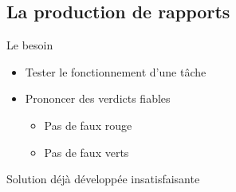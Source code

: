 \documentclass{beamer}
\begin{document}
	\subsection{La production de rapports}
	\begin{frame}{Le besoin}
		\begin{itemize}
			\item Tester le fonctionnement d'une tâche
	\pause
	\vfill
			\item Prononcer des verdicts fiables
				\begin{itemize}
			\item Pas de faux rouge
			\item Pas de faux verts
		\end{itemize}
			\pause
				\end{itemize}
				\vfill
		Solution déjà développée insatisfaisante
	\end{frame}
\end{document}
